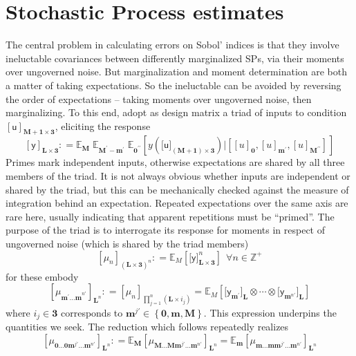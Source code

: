 \documentclass[preprint,12pt]{elsarticle}
\newcommand*{\M}[1]{\ensuremath{#1}\xspace}
\newcommand*{\x}{\times}
\newcommand*{\mi}[1]{\mathbf{#1}}
\newcommand*{\st}[1]{\mathbb{#1}}
\newcommand*{\rv}[1]{\mathsf{#1}}
\newcommand*{\te}[2][]{\left\lbrack{#2}\right\rbrack_{#1}}
\newcommand*{\tte}[2][]{\lbrack{#2}\rbrack_{#1}}
\newcommand*{\deq}{\M{\mathrel{\mathop:}=}}
\newcommand*{\ev}[3][]{\mathbb{E}_{#3}^{#1}\!\left\lbrack{#2}\right\rbrack}
\newcommand*{\evt}[3][]{\mathbb{E}_{#3}^{#1}\!#2}
\newcommand*{\set}[1]{\M{\left\lbrace{#1}\right\rbrace}}
\begin{document}
\section{Stochastic Process estimates}\label{sec:SPEst}
    The central problem in calculating errors on Sobol' indices is that they involve ineluctable covariances between differently marginalized SPs, via their moments over ungoverned noise. But marginalization and moment determination are both a matter of taking expectations. So the ineluctable can be avoided by reversing the order of expectations -- taking moments over ungoverned noise, then marginalizing.
    To this end, adopt as design matrix a triad of inputs to condition $\te[\mi{M+1\x 3}]{\rv{u}}$, eliciting the response
    \begin{equation}\label{def:SPEst:y}
        \te[\mi{L\x 3}]{\rv{y}} \deq 
        \evt{\;\evt{\;\ev{y(\tte[\mi{(M+1)\x 3}]{\rv{u}}) 
            \big\vert \te[]{\te[\mi{0}]{u}, \te[\mi{m^{\prime}}]{u}, \te[\mi{M^{\prime\prime}}]{u}}}{\mi{0^{\prime\prime}}}}
        {\mi{M^{\prime}-m^{\prime}}}}{\mi{M}}
    \end{equation}
    Primes mark independent inputs, otherwise expectations are shared by all three members of the triad. It is not always obvious whether inputs are independent or shared by the triad, but this can be mechanically checked against the measure of integration behind an expectation. Repeated expectations over the same axis are rare here, usually indicating that apparent repetitions must be ``primed''. The purpose of the triad is to interrogate its response for moments in respect of ungoverned noise (which is shared by the triad members)
    \begin{equation}\label{def:SPEst:mu}
            \te[(\mi{L\x 3})^{n}]{\mu_{n}} \deq \ev{\tte[\mi{L\x 3}]{\rv{y}}^{n}}{M} \ \ \forall n \in \st{Z}^{+}
    \end{equation}
    for these embody
    \begin{equation*}
        \te[\mi{L}^{n}]{\mu_{\mi{m^{\prime}\ldots m}^{n\prime}}} \deq \te[\prod_{j=1}^{n}(\mi{L\x}i_{j})]{\mu_{n}} = \ev{\tte[\mi{L}]{\rv{y}_{\mi{m}^{\prime}}}\otimes\cdots\otimes\tte[\mi{L}]{\rv{y}_{\mi{m}^{n\prime}}}}{M}
    \end{equation*}
    where $i_{j}\in \mi{3}$ corresponds to $\mi{m}^{j\prime} \in \set{\mi{0},\mi{m},\mi{M}}$. This expression underpins the quantities we seek. The reduction which follows repeatedly realizes
    \begin{equation}\label{eq:SPEst:reduction}
        \te[\mi{L}^{n}]{\mu_{\mi{0\ldots 0}\mi{m}^{j\prime}\mi{\ldots m}^{n\prime}}} \deq 
        \evt{\te[\mi{L}^{n}]{\mu_{\mi{M\ldots M}\mi{m}^{j\prime}\mi{\ldots m}^{n\prime}}}}{\mi{M}} = 
        \evt{\te[\mi{L}^{n}]{\mu_{\mi{m\ldots m}\mi{m}^{j\prime}\mi{\ldots m}^{n\prime}}}}{\mi{m}}
    \end{equation}
\end{document}
